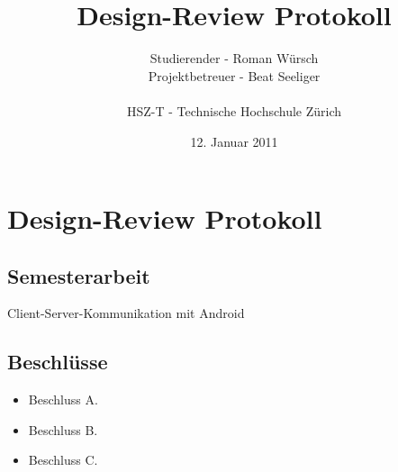 \documentclass[listof=totoc,bibliography=totoc]{scrreprt}
\title{Design-Review Protokoll}
\author{Studierender - Roman Würsch\\
    Projektbetreuer - Beat Seeliger\\
    \\
    HSZ-T - Technische Hochschule Zürich}
\date{12. Januar 2011}
\begin{document}
    \ifpdf
    \else
    \fi

    \maketitle



    \chapter{Design-Review Protokoll}

    \section{Semesterarbeit}
    Client-Server-Kommunikation mit Android

    \section{Beschlüsse}
    \begin{itemize}
        \item Beschluss A.
        \item Beschluss B.
        \item Beschluss C.
    \end{itemize}
    
\end{document}
